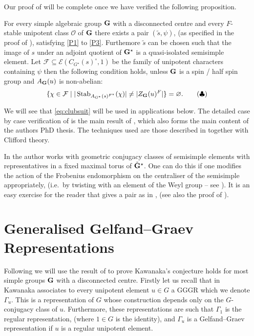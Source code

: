 \documentclass{jt-calcs}
\renewcommand{\cref}{\Cref}
\begin{document}
Our proof of \cref{thm:A} will be complete once we have verified the following proposition.

\begin{prop}\label{prop:A}
For every simple algebraic group $\mathbf{G}$ with a disconnected centre and every $F$-stable unipotent class $\mathcal{O}$ of $\mathbf{G}$ there exists a pair $(\tilde{s},\psi)$, (as specified in the proof of \cref{thm:A}), satisfying \ref{P1} to \ref{P3}. Furthemore $\tilde{s}$ can be chosen such that the image of $s$ under an adjoint quotient of $\mathbf{G}^{\star}$ is a quasi-isolated semisimple element. Let $\mathcal{F} \subseteq \mathcal{E}(C_{G^{\star}}(s)^{\circ},1)$ be the family of unipotent characters containing $\psi$ then the following condition holds, unless $\mathbf{G}$ is a spin / half spin group and $A_{\mathbf{G}}(u)$ is non-abelian:
\begin{equation}\label{eq:clubsuit}
\{\chi \in \mathcal{F} \mid |\Stab_{A_{G^{\star}}(s)^{F^{\star}}}(\chi)| \neq |Z_{\bG}(u)^F|\} = \emptyset.\tag{$\clubsuit$}
\end{equation}
\end{prop}

\noindent We will see that \eqref{eq:clubsuit} will be used in applications below. The detailed case by case verification of \cref{prop:A} is the main result of \cite{taylor:2012:finding-characters-satisfying}, which also forms the main content of the authors PhD thesis. The techniques used are those described in \cite[\S 2]{geck-hezard:2008:unipotent-support} together with Clifford theory.

\begin{rem}
In \cite{taylor:2012:finding-characters-satisfying} the author works with geometric conjugacy classes of semisimple elements with representatives in a fixed maximal torus of $\tilde{\mathbf{G}}^{\star}$. One can do this if one modifies the action of the Frobenius endomorphism on the centraliser of the semisimple appropriately, (i.e.\ by twisting with an element of the Weyl group -- see \cite[\S2]{taylor:2012:finding-characters-satisfying}). It is an easy exercise for the reader that \cite[Theorem 2.5]{taylor:2012:finding-characters-satisfying} gives a pair as in \cref{prop:A}, (see also the proof of \cite[Theorem A]{taylor:2012:thesis}).
\end{rem}

\section{Generalised Gelfand--Graev Representations}\label{sec:GGGR}
Following \cite{geck-hezard:2008:unipotent-support} we will use the result of \cref{thm:A} to prove Kawanaka's conjecture holds for most simple groups $\mathbf{G}$ with a disconnected centre. Firstly let us recall that in \cite[\S 3.1]{kawanaka:1986:GGGRs-exceptional} Kawanaka associates to every unipotent element $u \in G$ a GGGR which we denote $\Gamma_u$. This is a representation of $G$ whose construction depends only on the $G$-conjugacy class of $u$. Furthermore, these representations are such that $\Gamma_1$ is the regular representation, (where $1 \in G$ is the identity), and $\Gamma_u$ is a Gelfand--Graev representation if $u$ is a regular unipotent element.
\end{document}
